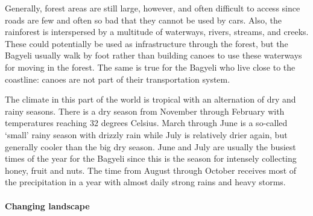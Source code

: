 Generally, forest areas are still large, however, and often difficult to access since roads are few and often so bad that they cannot be used by cars. Also, the rainforest is interspersed by a multitude of waterways, rivers, streams, and creeks. These could potentially be used as infrastructure through the forest, but the Bagyeli usually walk by foot rather than building canoes to use these waterways for moving in the forest. The same is true for the Bagyeli who live close to the coastline: canoes are not part of their transportation system.

The climate in this part of the world is tropical with an alternation of dry and rainy seasons. There is a dry season from November through February with temperatures reaching 32 degrees Celsius. March through June is a so-called `small' rainy season with drizzly rain while July is relatively drier again, but generally cooler than the big dry season. June and July are usually the busiest times of the year for the Bagyeli since this is the season for intensely collecting honey, fruit and nuts. The time from August through October receives most of the precipitation in a year with almost daily strong rains and heavy storms.


\paragraph{Changing landscape} 


